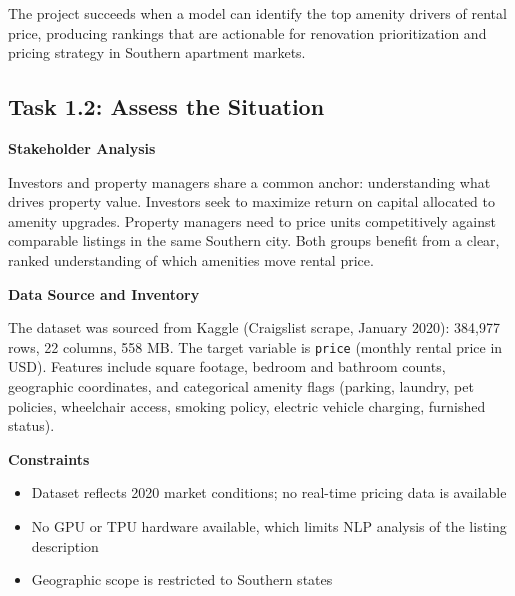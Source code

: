 The project succeeds when a model can identify the top amenity drivers of rental price, producing rankings that are actionable for renovation prioritization and pricing strategy in Southern apartment markets.

\subsection*{Task 1.2: Assess the Situation}

\noindent
\textbf{Stakeholder Analysis}

Investors and property managers share a common anchor: understanding what drives property value. Investors seek to maximize return on capital allocated to amenity upgrades. Property managers need to price units competitively against comparable listings in the same Southern city. Both groups benefit from a clear, ranked understanding of which amenities move rental price.

\medskip\noindent
\textbf{Data Source and Inventory}

The dataset was sourced from Kaggle (Craigslist scrape, January 2020): 384,977 rows, 22 columns, 558 MB. The target variable is \texttt{price} (monthly rental price in USD). Features include square footage, bedroom and bathroom counts, geographic coordinates, and categorical amenity flags (parking, laundry, pet policies, wheelchair access, smoking policy, electric vehicle charging, furnished status).

\medskip\noindent
\textbf{Constraints}
\vspace{-9pt}
\begin{itemize}[itemsep=-9pt]
    \item Dataset reflects 2020 market conditions; no real-time pricing data is available
    \item No GPU or TPU hardware available, which limits NLP analysis of the listing description%
    \item Geographic scope is restricted to Southern states %
\end{itemize}

